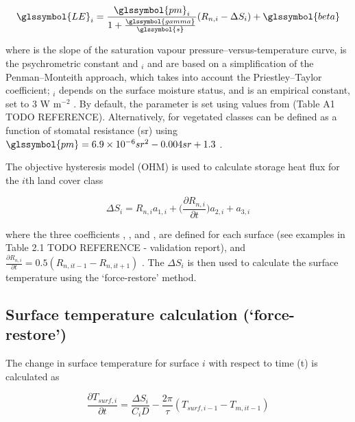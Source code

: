 \documentclass[final,3p,times,authoryear]{elsarticle}
\begin{document}
\begin{equation} 
\glssymbol{LE}_{i} = 
\frac{\glssymbol{pm}_{i}}{1+\frac{\glssymbol{gamma}}{\glssymbol{s}}}
(R_{n,i}-\Delta S_{i})+ \glssymbol{beta}
\label{eq:LE} \end{equation} 

where  is the slope of the saturation vapour pressure–versus-temperature curve,  is the psychrometric constant and $_{i}$ and  are based on a simplification of the Penman–Monteith approach, which takes into account the Priestley–Taylor coefficient; $_{i}$ depends on the surface moisture status, and  is an empirical constant, set to 3 W m$^{-2}$ \citep{Grimmond2002a}. By default, the  parameter is set using values from \cite{Hanna1992} (Table A1 TODO REFERENCE). Alternatively,  for vegetated classes can be defined as a function of stomatal resistance (sr) using $\glssymbol{pm} = 6.9\times10^{-6} sr^{2} - 0.004 sr + 1.3$ \citep{DeBruin1983}.  

The objective hysteresis model (OHM) is used to calculate storage heat flux for the $i$th land cover class  \citep{Grimmond2002a} 

\begin{equation} 
\Delta S_{i} = R_{n,i} a_{1,i} + \Big( \frac{\partial R_{n,i}}{\partial t}   \Big)a_{2,i} + a_{3,i}
\label{eq:ohm} \end{equation} 


where the three coefficients , , and , are defined for each surface (see examples in Table 2.1 TODO REFERENCE - validation report), and $\frac{\partial R_{n,i}}{\partial t} =0.5(R_{n,it-1} - R_{n,it+1})$  .  The $\Delta S_{i}$ is then used to calculate the surface temperature using the `force-restore' method.


\subsection{Surface temperature calculation (`force-restore')}\label{sec:tsurf}

The change in surface temperature  for surface $i$ with respect to time (t) is calculated as

\begin{equation} 
\frac{\partial T_{surf,i}}{\partial t}= \frac{\Delta S_{i}}{C_{i} D} - \frac{2 \pi}{\tau} (T_{surf,i -1} - T_{m,it-1})
\label{eq:tsurf} \end{equation} 
\end{document}
